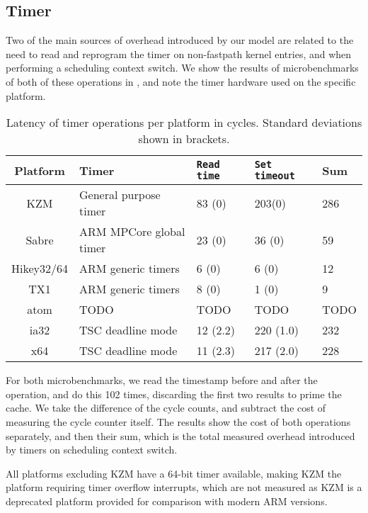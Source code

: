 \subsection{Timer}

Two of the main sources of overhead introduced by our model are related to the need to read and reprogram the timer on
non-fastpath kernel entries, and when performing a scheduling context switch. We show the results of
microbenchmarks of both of these operations in , and note the timer
hardware used on the specific platform. 

\begin{table}[ht]\centering
\begin{tabular}{|c|l|l|l|l|}\hline
    \textbf{Platform} & \textbf{Timer} & \texttt{Read time} & \texttt{Set timeout} & \textbf{Sum} \\\hline
    KZM               & General purpose timer    & 83 (0)   & 203(0)  & 286   \\\hline
    Sabre             & ARM MPCore global timer  & 23 (0)   & 36 (0)  & 59    \\\hline
    Hikey32/64        & ARM generic timers       &  6 (0)   &  6 (0)  & 12    \\\hline
    TX1               & ARM generic timers       &  8 (0)   &  1 (0)  & 9     \\\hline
    atom              & TODO                     & TODO     & TODO    & TODO  \\\hline
    ia32              & TSC deadline mode        & 12 (2.2) & 220 (1.0) & 232 \\\hline
    x64               & TSC deadline mode        & 11 (2.3) & 217 (2.0) & 228 \\\hline 
\end{tabular}
\caption{Latency of timer operations per platform in cycles. Standard deviations shown
in brackets.}
\label{t:evaluation-timer}
\end{table}

For both microbenchmarks, we read the timestamp before and after the operation, and do this 102
times, discarding the first two results to prime the cache.  We take the difference of the cycle
counts, and subtract the cost of measuring the cycle counter itself. The results show the cost of
both operations separately, and then their sum, which is the total measured overhead introduced by timers on
scheduling context switch.

All platforms excluding KZM have a 64-bit timer available, making KZM the platform requiring
timer overflow interrupts, which are not measured as KZM is a deprecated platform provided for comparison
with modern ARM versions.

